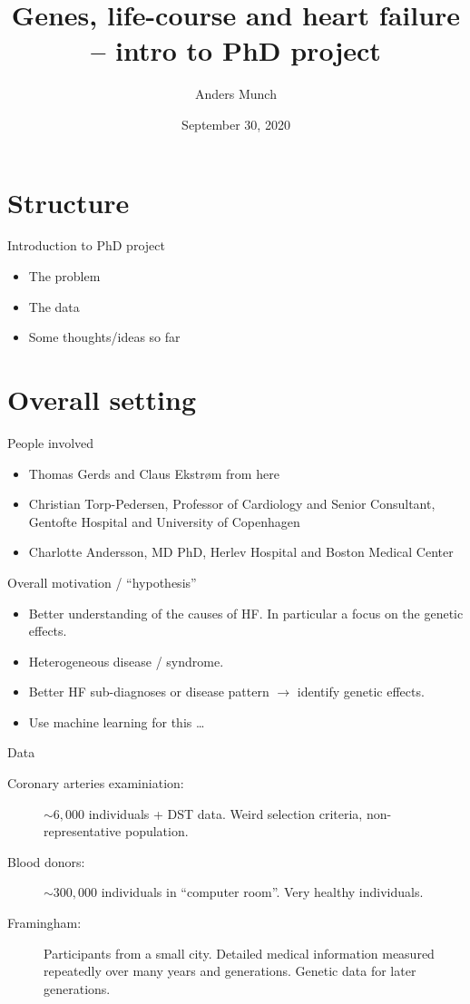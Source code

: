 \documentclass{beamer}\usepackage{listings}
\author{Anders Munch}
\date{September 30, 2020}
\title{Genes, life-course and heart failure -- intro to PhD project}
\begin{document}
\maketitle
\section{Structure}
\label{sec:org35f3b03}
\begin{frame}[label={sec:orgedeb247}]{Introduction to PhD project}
\begin{itemize}
\item The problem
\item The data
\item Some thoughts/ideas so far
\end{itemize}
\end{frame}

\section{Overall setting}
\label{sec:org3f40a48}
\begin{frame}[label={sec:org0e0a31e}]{People involved}
\begin{itemize}
\item Thomas Gerds and Claus Ekstrøm from here
\item Christian Torp-Pedersen, Professor of Cardiology and Senior Consultant, Gentofte Hospital and University of Copenhagen
\item Charlotte Andersson, MD PhD, Herlev Hospital and Boston Medical Center
\end{itemize}
\end{frame}

\begin{frame}[label={sec:orgc668c64}]{Overall motivation / ``hypothesis''}
\begin{itemize}
\item Better understanding of the causes of HF. In particular a focus on the genetic effects. \pause
\item Heterogeneous disease / syndrome. \pause
\item Better HF sub-diagnoses or disease pattern \(\rightarrow\) identify genetic effects. \pause
\item Use machine learning for this \ldots{}
\end{itemize}
\end{frame}

\begin{frame}[label={sec:org68519aa}]{Data}
\begin{description}
\item[{Coronary arteries examiniation:}] \(\sim 6,000\) individuals + DST data. Weird selection criteria,
non-representative population.
\item[{Blood donors:}] \(\sim 300,000\) individuals in ``computer room''. Very healthy individuals.
\item[{Framingham:}] Participants from a small city. Detailed medical information measured repeatedly
over many years and generations. Genetic data for later generations.
\end{description}
\end{frame}
\end{document}
